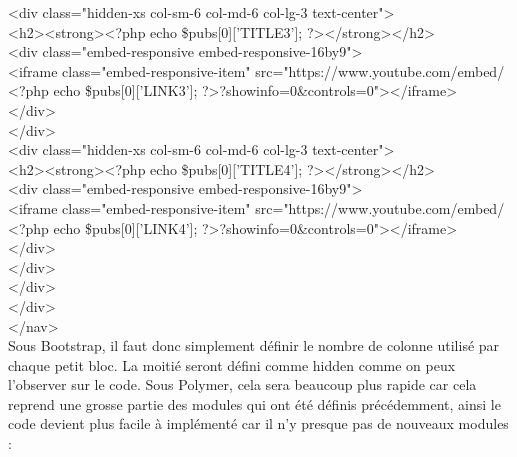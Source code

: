\documentclass{article}
\begin{document}
{{\hspace*{2.4cm}<div class="hidden-xs col-sm-6 col-md-6 col-lg-3 text-center">\\
\hspace*{3.0cm}<h2><strong><?php echo \$pubs[0]['TITLE3']; ?></strong></h2>\\
\hspace*{3.0cm}<div class="embed-responsive embed-responsive-16by9">\\
\hspace*{3.0cm}<iframe class="embed-responsive-item" src="https://www.youtube.com/embed/ <?php echo \$pubs[0]['LINK3']; ?>?showinfo=0\&controls=0"></iframe>\\
\hspace*{3.0cm}</div>\\
\hspace*{2.4cm}</div>\\
\hspace*{2.4cm}<div class="hidden-xs col-sm-6 col-md-6 col-lg-3 text-center">\\
\hspace*{3.0cm}<h2><strong><?php echo \$pubs[0]['TITLE4']; ?></strong></h2>\\
\hspace*{3.0cm}<div class="embed-responsive embed-responsive-16by9">\\
\hspace*{3.0cm}<iframe class="embed-responsive-item" src="https://www.youtube.com/embed/ <?php echo \$pubs[0]['LINK4']; ?>?showinfo=0\&controls=0"></iframe>\\
\hspace*{3.0cm}</div>\\
\hspace*{2.4cm}</div>\\
\hspace*{1.8cm}</div>\\
\hspace*{1.2cm}</div>\\
</nav>
}}
\vspace{0.5cm}\\
Sous Bootstrap, il faut donc simplement d\'efinir le nombre de colonne utilis\'e par chaque petit bloc. La moiti\'e seront d\'efini comme \og hidden \fg{} comme on peux l'observer sur le code. Sous Polymer, cela sera beaucoup plus rapide car cela reprend une grosse partie des modules qui ont \'et\'e d\'efinis pr\'ec\'edemment, ainsi le code devient plus facile \`a impl\'ement\'e car il n'y presque pas de nouveaux modules :
\vspace{0.5cm}\\
\end{document}
